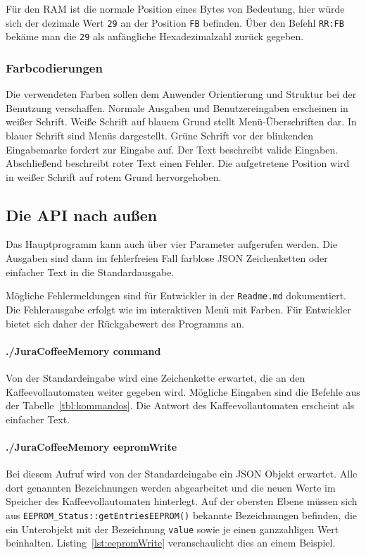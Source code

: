 Für den \ac{RAM} ist die normale Position eines Bytes von Bedeutung, hier würde sich der dezimale Wert \texttt{29} an der Position \texttt{FB} befinden.
Über den Befehl \texttt{RR:FB} bekäme man die \texttt{29} als anfängliche Hexadezimalzahl zurück gegeben.

\subsubsection{Farbcodierungen}
Die verwendeten Farben sollen dem Anwender Orientierung und Struktur bei der Benutzung verschaffen.
Normale Ausgaben und Benutzereingaben erscheinen in weißer Schrift.
Weiße Schrift auf blauem Grund stellt Menü-Überschriften dar.
In blauer Schrift sind Menüs dargestellt.
Grüne Schrift vor der blinkenden Eingabemarke fordert zur Eingabe auf.
Der Text beschreibt valide Eingaben.
Abschließend beschreibt roter Text einen Fehler.
Die aufgetretene Position wird in weißer Schrift auf rotem Grund hervorgehoben.

\subsection{Die API nach außen}
Das Hauptprogramm kann auch über vier Parameter aufgerufen werden. Die Ausgaben sind dann im fehlerfreien Fall farblose \ac{JSON} Zeichenketten oder einfacher Text in die Standardausgabe.

Mögliche Fehlermeldungen sind für Entwickler in der \texttt{Readme.md} dokumentiert.
Die Fehlerausgabe erfolgt wie im interaktiven Menü mit Farben.
Für Entwickler bietet sich daher der Rückgabewert des Programms an.

\paragraph{./JuraCoffeeMemory command}
Von der Standardeingabe wird eine Zeichenkette erwartet, die an den Kaffeevollautomaten weiter gegeben wird.
Mögliche Eingaben sind die Befehle aus der Tabelle~\ref{tbl:kommandos}.
Die Antwort des Kaffeevollautomaten erscheint als einfacher Text.

\paragraph{./JuraCoffeeMemory eepromWrite}
Bei diesem Aufruf wird von der Standardeingabe ein \ac{JSON} Objekt erwartet.
Alle dort genannten Bezeichnungen werden abgearbeitet und die neuen Werte im Speicher des Kaffeevollautomaten hinterlegt.
Auf der obersten Ebene müssen sich aus \texttt{EEPROM\_Status::getEntriesEEPROM()} bekannte Bezeichnungen befinden, die ein Unterobjekt mit der Bezeichnung \texttt{value} sowie je einen ganzzahligen Wert beinhalten.
Listing~\ref{lst:eepromWrite} veranschaulicht dies an einem Beispiel.

